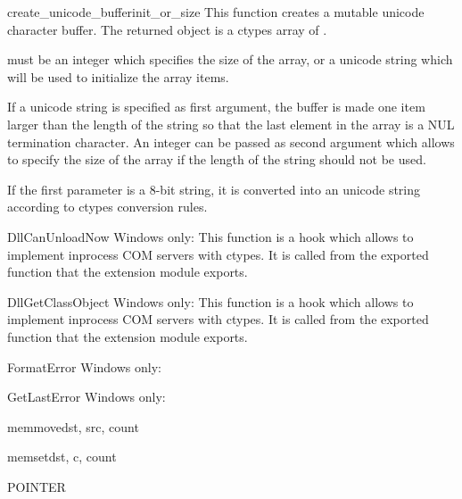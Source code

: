 \begin{funcdesc}{create_unicode_buffer}{init_or_size}
This function creates a mutable unicode character buffer.  The
returned object is a ctypes array of .

 must be an integer which specifies the size of the
array, or a unicode string which will be used to initialize the array
items.

If a unicode string is specified as first argument, the buffer is made
one item larger than the length of the string so that the last element
in the array is a NUL termination character.  An integer can be passed
as second argument which allows to specify the size of the array if
the length of the string should not be used.

If the first parameter is a 8-bit string, it is converted into an
unicode string according to ctypes conversion rules.
\end{funcdesc}

\begin{funcdesc}{DllCanUnloadNow}{}
Windows only: This function is a hook which allows to implement
inprocess COM servers with ctypes.  It is called from the
 exported function that the 
extension module exports.
\end{funcdesc}

\begin{funcdesc}{DllGetClassObject}{}
Windows only: This function is a hook which allows to implement
inprocess COM servers with ctypes.  It is called from the
 exported function that the 
extension module exports.
\end{funcdesc}

\begin{funcdesc}{FormatError}{}
Windows only:
\end{funcdesc}

\begin{funcdesc}{GetLastError}{}
Windows only:
\end{funcdesc}

\begin{funcdesc}{memmove}{dst, src, count}
\end{funcdesc}

\begin{funcdesc}{memset}{dst, c, count}
\end{funcdesc}

\begin{funcdesc}{POINTER}{}
\end{funcdesc}

